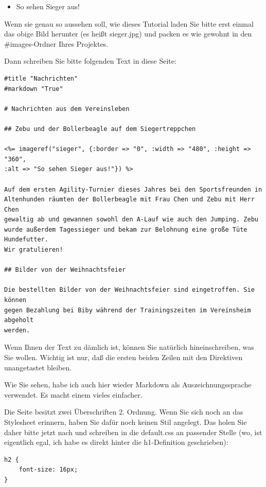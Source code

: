 \documentclass[11pt]{report}
\begin{document}
\begin{itemize}
\item So sehen Sieger aus!
\end{itemize}

Wenn sie genau so aussehen soll, wie dieses Tutorial laden Sie bitte
erst einmal das obige Bild herunter (es heißt sieger.jpg) und packen
es wie gewohnt in den \#images-Ordner Ihres Projektes.

Dann schreiben Sie bitte folgenden Text in diese Seite:


\begin{verbatim}
#title "Nachrichten"
#markdown "True"

# Nachrichten aus dem Vereinsleben

## Zebu und der Bollerbeagle auf dem Siegertreppchen

<%= imageref("sieger", {:border => "0", :width => "480", :height => "360",
:alt => "So sehen Sieger aus!"}) %>

Auf dem ersten Agility-Turnier dieses Jahres bei den Sportsfreunden in
Altenhunden räumten der Bollerbeagle mit Frau Chen und Zebu mit Herr Chen
gewaltig ab und gewannen sowohl den A-Lauf wie auch den Jumping. Zebu
wurde außerdem Tagessieger und bekam zur Belohnung eine große Tüte Hundefutter.
Wir gratulieren!

## Bilder von der Weihnachtsfeier

Die bestellten Bilder von der Weihnachtsfeier sind eingetroffen. Sie können
gegen Bezahlung bei Biby während der Trainingszeiten im Vereinsheim abgeholt
werden.
\end{verbatim}

Wenn Ihnen der Text zu dämlich ist, können Sie natürlich
hineinschreiben, was Sie wollen. Wichtig ist nur, daß die ersten
beiden Zeilen mit den Direktiven unangetastet bleiben.

Wie Sie sehen, habe ich auch hier wieder Markdown als
Auszeichnungssprache verwendet. Es macht einem vieles einfacher.

Die Seite besitzt zwei Überschriften 2. Ordnung. Wenn Sie sich noch an
das Stylesheet erinnern, haben Sie dafür noch keinen Stil
angelegt. Das holen Sie daher bitte jetzt nach und schreiben in die
default.css an passender Stelle (wo, ist eigentlich egal, ich habe es
direkt hinter die h1-Definition geschrieben):


\begin{verbatim}
h2 {
    font-size: 16px;
}
\end{verbatim}
\end{document}
